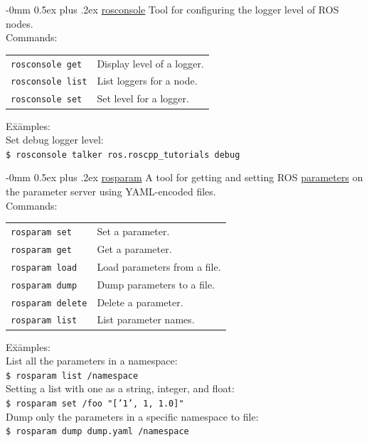\documentclass[10pt,landscape]{article}
\makeatletter
\renewcommand{\subsection}{\@startsection{subsection}{2}{0mm}%
                                {-0mm}%
                                {0.5ex plus .2ex}%
                                {\normalfont\normalsize\bfseries}}
\newenvironment{nstabbing}
  {\setlength{\topsep}{1pt}%
   \setlength{\partopsep}{1pt}%
   \tabbing}
  {\endtabbing}
\makeatother
\begin{document}
\begin{multicols}{3}
\subsection{\href{http://wiki.ros.org/rosnode}{rosconsole}}
\vspace{-1 mm}
Tool for configuring the logger level of ROS nodes.\\
Commands: \\
\begin{tabular}{p{\the\MyLen}%
                @{}p{\linewidth-\the\MyLen}@{}}
\texttt{rosconsole get}    & Display level of a logger. \\
\texttt{rosconsole list}   & List loggers for a node. \\
\texttt{rosconsole set}    & Set level for a logger.
\end{tabular}
\vspace{-1 mm}
\begin{nstabbing}
E\=x\=amples:\\
\> Set debug logger level:\\
\> \> \texttt{\$ rosconsole talker ros.roscpp\_tutorials debug}
\end{nstabbing}

\subsection{\href{http://wiki.ros.org/rosparam}{rosparam}}
A tool for getting and setting ROS \href{http://wiki.ros.org/Parameter Server}{parameters} on the parameter server using YAML-encoded files.\\
Commands: \\
\begin{tabular}{p{\the\MyLen}%
                @{}p{\linewidth-\the\MyLen}@{}}
\texttt{rosparam set}    & Set a parameter. \\
\texttt{rosparam get}    & Get a parameter. \\
\texttt{rosparam load}   & Load parameters from a file. \\
\texttt{rosparam dump}   & Dump parameters to a file. \\
\texttt{rosparam delete} & Delete a parameter. \\
\texttt{rosparam list}   & List parameter names.
\end{tabular}
\begin{nstabbing}
E\=x\=amples:\\
\> List all the parameters in a namespace:\\
\> \>\texttt{\$ rosparam list /namespace}\\
\> Setting a list with one as a string, integer, and float:\\
\> \>\texttt{\$ rosparam set /foo "['1', 1, 1.0]"}\\
\> Dump only the parameters in a specific namespace to file:\\
\> \>\texttt{\$ rosparam dump dump.yaml /namespace}
\end{nstabbing}


\end{multicols}
\end{document}
